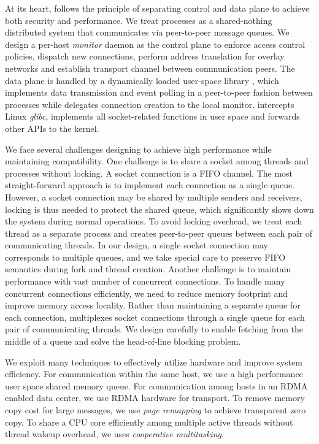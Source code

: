 At its heart, \sys{} follows the principle of separating control and data plane to achieve both security and performance. We treat processes as a shared-nothing distributed system that communicates via peer-to-peer message queues.
We design a per-host \emph{monitor} daemon as the control plane to enforce access control policies, dispatch new connections, perform address translation for overlay networks and establish transport channel between communication peers.
The data plane is handled by a dynamically loaded user-space library \libipc{}, which implements data transmission and event polling in a peer-to-peer fashion between processes while delegates connection creation to the local monitor.
\libipc{} intercepts Linux \emph{glibc}, implements all socket-related functions in user space and forwards other APIs to the kernel.


We face several challenges designing \sys{} to achieve high performance while maintaining compatibility. 
One challenge is to share a socket among threads and processes without locking. A socket connection is a FIFO channel. 
The most straight-forward approach is to implement each connection as a single queue. However, a socket connection may be shared by multiple 
senders and receivers, locking is thus needed to protect the shared queue, which significantly slows down the system during 
normal operations. To avoid locking overhead, we treat each thread as a separate process and creates peer-to-peer queues between each pair of 
communicating threads. In our design, a single socket connection may corresponds to multiple queues, and we take special care to preserve
FIFO semantics during fork and thread creation. Another challenge is to maintain performance with vast number of concurrent connections. 
To handle many concurrent connections efficiently, we need to reduce memory footprint and improve memory access locality. 
Rather than maintaining a separate queue for each connection, \sys multiplexes socket connections through a single queue for each pair of communicating threads.
We design \sys carefully to enable fetching from the middle of a queue and solve the head-of-line blocking problem. 

We exploit many techniques to effectively utilize hardware and improve system efficiency. 
For communication within the same host, we use a high performance user space shared memory queue.
For communication among hosts in an RDMA enabled data center, we use RDMA hardware for transport. 
To remove memory copy cost for large messages, we use \emph{page remapping} to achieve transparent zero copy.
To share a CPU core efficiently among multiple active threads without thread wakeup overhead, we uses \emph{cooperative multitasking}. 

